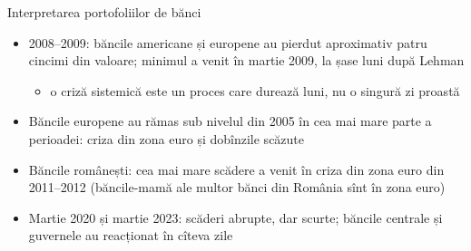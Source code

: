 \begin{frame}{Interpretarea portofoliilor de bănci}
\itemsize{\small}
\begin{itemize}
    \item 2008--2009: băncile americane și europene au pierdut aproximativ patru cincimi din valoare; minimul a venit în martie 2009, la șase luni după Lehman
    \begin{itemize}
        \item o criză sistemică este un proces care durează luni, nu o singură zi proastă
    \end{itemize}
    \item Băncile europene au rămas sub nivelul din 2005 în cea mai mare parte a perioadei: criza din zona euro și dobînzile scăzute
    \item Băncile românești: cea mai mare scădere a venit în criza din zona euro din 2011--2012 (băncile-mamă ale multor bănci din România sînt în zona euro)
    \item Martie 2020 și martie 2023: scăderi abrupte, dar scurte; băncile centrale și guvernele au reacționat în cîteva zile
\end{itemize}
\end{frame}

